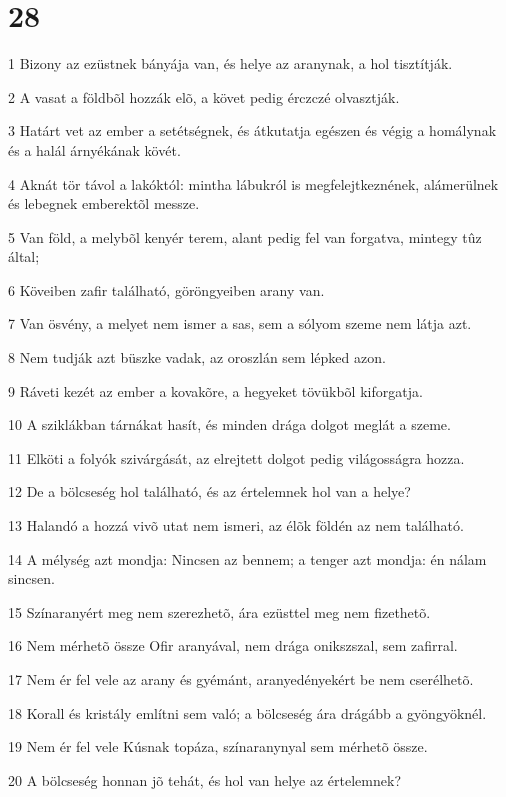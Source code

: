 \chapter{28}

\par 1 Bizony az ezüstnek bányája van, és helye az aranynak, a hol tisztítják.
\par 2 A vasat a földbõl hozzák elõ, a követ pedig érczczé olvasztják.
\par 3 Határt vet az ember a setétségnek, és átkutatja egészen és végig a homálynak és a halál árnyékának kövét.
\par 4 Aknát tör távol a lakóktól: mintha lábukról is megfelejtkeznének, alámerülnek és lebegnek emberektõl messze.
\par 5 Van föld, a melybõl kenyér terem, alant pedig fel van forgatva, mintegy tûz által;
\par 6 Köveiben zafir található, göröngyeiben arany van.
\par 7 Van ösvény, a melyet nem ismer a sas, sem a sólyom szeme nem látja azt.
\par 8 Nem tudják azt büszke vadak, az oroszlán sem lépked azon.
\par 9 Ráveti kezét az ember a kovakõre, a hegyeket tövükbõl kiforgatja.
\par 10 A sziklákban tárnákat hasít, és minden drága dolgot meglát a szeme.
\par 11 Elköti a folyók szivárgását, az elrejtett dolgot pedig világosságra hozza.
\par 12 De a bölcseség hol található, és az értelemnek hol van a helye?
\par 13 Halandó a hozzá vivõ utat nem ismeri, az élõk földén az nem található.
\par 14 A mélység azt mondja: Nincsen az bennem; a tenger azt mondja: én nálam sincsen.
\par 15 Színaranyért meg nem szerezhetõ, ára ezüsttel meg nem fizethetõ.
\par 16 Nem mérhetõ össze Ofir aranyával, nem drága onikszszal, sem zafirral.
\par 17 Nem ér fel vele az arany és gyémánt, aranyedényekért be nem cserélhetõ.
\par 18 Korall és kristály említni sem való; a bölcseség ára drágább a gyöngyöknél.
\par 19 Nem ér fel vele Kúsnak topáza, színaranynyal sem mérhetõ össze.
\par 20 A bölcseség honnan jõ tehát, és hol van helye az értelemnek?
